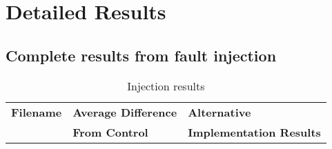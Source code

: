\section{Detailed Results}

\subsection{Complete results from fault injection}\label{appendix:complete_injection_results}

\begin{longtable}{lll}
\caption{Injection results}
\label{lst:injection_results}\\
{\bf Filename} & {\bf Average Difference} & {\bf Alternative } \\
             & {\bf From Control }      & {\bf Implementation Results}\\
 

\end{longtable}
